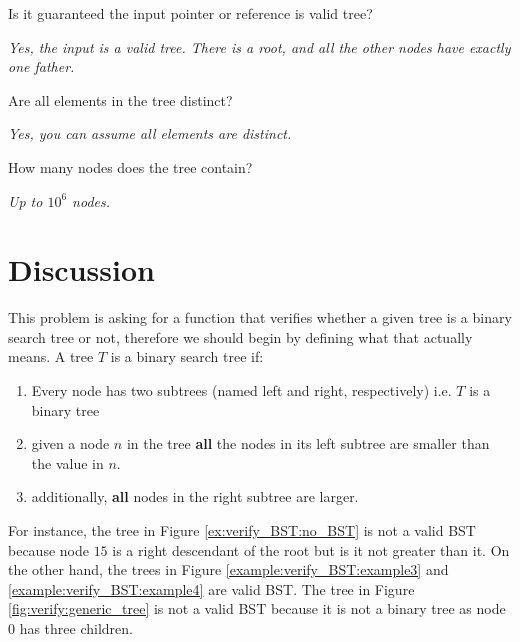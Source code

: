 \begin{QandA}
	\item \begin{questionitem} \begin{question} Is it guaranteed the input pointer or reference is valid tree?  \end{question} 	 
    \begin{answered}
		\textit{Yes, the input is a valid tree. There is a root, and all the other nodes have exactly one father.}
	\end{answered} \end{questionitem}
	\item \begin{questionitem} \begin{question} Are all elements in the tree distinct?  \end{question} 	 
    \begin{answered}
		\textit{Yes, you can assume all elements are distinct.}
	\end{answered} \end{questionitem}
	\item \begin{questionitem} \begin{question} How many nodes does the tree contain?  \end{question} 	 
    \begin{answered}
		\textit{Up to $10^6$ nodes.}
	\end{answered} \end{questionitem}
\end{QandA}

\section{Discussion}
\label{verify_BST:sec:discussion}
This problem is asking for a function that verifies whether a given tree is a binary search tree or not, therefore we should begin by defining what that actually means.
A tree $T$ is a binary search tree if:
\begin{enumerate}
	\item Every node has two subtrees (named left and right, respectively) i.e. $T$ is a binary tree
	\item given a node $n$ in the tree \textbf{all} the nodes in its left subtree are smaller than the value in $n$.
	\item additionally,  \textbf{all} nodes in the right subtree are larger.
\end{enumerate}
For instance, the tree in Figure \ref{ex:verify_BST:no_BST} is not a valid BST because node $15$ is a right descendant of the root but is it not greater than it. On the other hand, the trees in Figure \ref{example:verify_BST:example3} and \ref{example:verify_BST:example4} are valid BST. The tree in Figure \ref{fig:verify:generic_tree} is not a valid BST because it is not a binary tree as node $0$ has three children.

